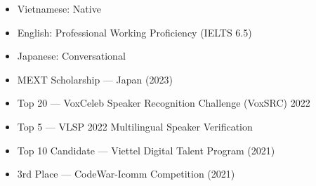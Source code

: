 %
%
%

\begin{minipage}[t]{\dimexpr(\linewidth/2) - 1em}
\begin{itemize}
    \item Vietnamese: Native
    \item English: Professional Working Proficiency (IELTS 6.5)
    \item Japanese: Conversational
\end{itemize}
\end{minipage}
\hspace{2em}
\begin{minipage}[t]{\dimexpr(\linewidth/2) - 1em}
\begin{itemize}
	\item MEXT Scholarship --- Japan (2023)
	\item Top 20 --- VoxCeleb Speaker Recognition Challenge (VoxSRC) 2022
	\item Top 5 --- VLSP 2022 Multilingual Speaker Verification
	\item Top 10 Candidate --- Viettel Digital Talent Program (2021)
	\item 3rd Place --- CodeWar-Icomm Competition (2021)
\end{itemize}
\end{minipage}

